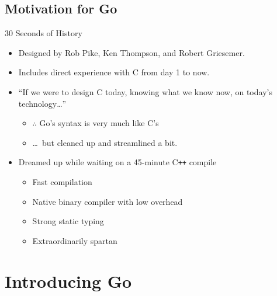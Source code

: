 \documentclass[pdf,t]{beamer}
\begin{document}
\subsection{Motivation for Go}
\begin{frame}{30 Seconds of History}
    \begin{itemize}
        \item Designed by Rob Pike, Ken Thompson, and Robert Griesemer.
        \item Includes direct experience with C from day 1 to now.
            \pause
        \item ``If we were to design C today, knowing what we know now, on today's technology\dots''
            \pause
            \begin{itemize}
        \item $\therefore$ Go's syntax is very much like C's
        \item \dots\ but cleaned up and streamlined a bit.
            \end{itemize}
        \pause
    \item Dreamed up while waiting on a 45-minute C\texttt{++} compile
        \pause
            \begin{itemize}
                \item Fast compilation
                \item Native binary compiler with low overhead
                \item Strong static typing
                \item Extraordinarily spartan
            \end{itemize}
    \end{itemize}
\end{frame}
\section{Introducing Go}
\end{document}
